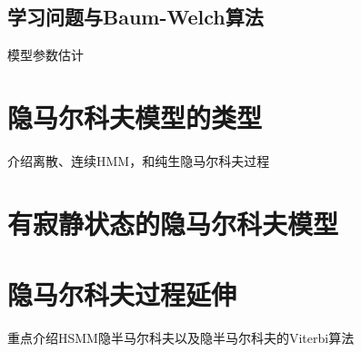 \documentclass[UTF8]{ctexart}
\begin{document}
\subsection{学习问题与Baum-Welch算法}

模型参数估计

\section{隐马尔科夫模型的类型}

介绍离散、连续HMM，和纯生隐马尔科夫过程

\section{有寂静状态的隐马尔科夫模型}

\section{隐马尔科夫过程延伸}

重点介绍HSMM隐半马尔科夫以及隐半马尔科夫的Viterbi算法
\end{document}
